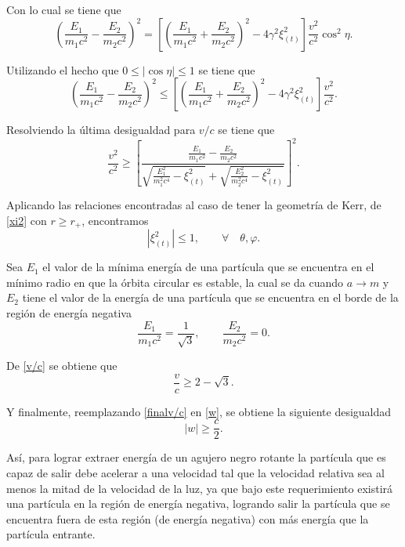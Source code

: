 Con lo cual se tiene que
\begin{equation}
\left(\frac{E_1}{m_1c^2}-\frac{E_2}{m_2c^2} \right)^2=\left[\left(\frac{E_1}{m_1c^2}+\frac{E_2}{m_2c^2}\right)^2-4\gamma^2 \xi_{(t)}^2   \right]\frac{v^2}{c^2}\cos^2 \eta.
\end{equation}

Utilizando el hecho que $0\leq |\cos \eta| \leq 1$ se tiene que
\begin{equation}
\left(\frac{E_1}{m_1c^2}-\frac{E_2}{m_2c^2} \right)^2 \leq \left[\left(\frac{E_1}{m_1c^2}+\frac{E_2}{m_2c^2} \right)^2-4\gamma^2 \xi_{(t)}^2 \right]\frac{v^2}{c^2}.
\end{equation}

Resolviendo la \'ultima desigualdad para $v/c$ se tiene que
\begin{equation}\label{v/c}
\frac{v^2}{c^2} \geq \left[ \frac{\frac{E_1}{m_1c^2} -\frac{E_2}{m_2c^2}}{\sqrt{\frac{E_1^2}{m_{1}^{2}c^{4}}-\xi_{(t)}^2}+\sqrt{ \frac{E_2^2}{m_{2}^{2}c^{4}} -\xi_{(t)}^2}}\right]^2 .
\end{equation}

Aplicando las relaciones encontradas al caso de tener la geometr\'ia de Kerr, de \eqref{xi2} con $r \geq r_+$, encontramos
\begin{equation}
|\xi_{(t)}^2| \leq 1, \qquad  \forall \quad \theta,\varphi .
\end{equation}

Sea $E_1$ el valor de la m\'inima energ\'ia de una part\'icula que se encuentra en el m\'inimo radio en que la \'orbita circular es estable, la cual se da cuando $a \rightarrow m$ y $E_2$ tiene el valor de la energ\'ia de una part\'icula que se encuentra en el borde de la regi\'on de energ\'ia negativa
\begin{equation}
\frac{E_1}{m_1c^2}=\frac{1}{\sqrt{3}}, \qquad \frac{E_2}{m_2c^2}=0.
\end{equation}

De \eqref{v/c} se obtiene que
\begin{equation}\label{finalv/c}
\frac{v}{c} \geq 2-\sqrt{3}.
\end{equation}

Y finalmente, reemplazando \eqref{finalv/c} en \eqref{w}, se obtiene la siguiente desigualdad
\begin{equation}
|w|\geq \frac{c}{2}.
\end{equation}

As\'i, para lograr extraer energ\'ia de un agujero negro rotante la part\'icula que es capaz de salir debe acelerar a una velocidad tal que la velocidad relativa sea al menos la mitad de la velocidad de la luz, ya que bajo este requerimiento existir\'a una part\'icula en la regi\'on de energ\'ia negativa, logrando salir la part\'icula que se encuentra fuera de esta regi\'on (de energ\'ia negativa) con m\'as energ\'ia que la part\'icula entrante.\\

